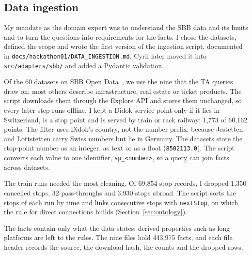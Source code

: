 %   

\subsection{Data ingestion}
\label{sec:ingestion}

My mandate as the domain expert was to understand the SBB data and its limits and to turn the questions into requirements for the facts. I chose the datasets, defined the scope and wrote the first version of the ingestion script, documented in \texttt{docs/hackathon01/DATA\_INGESTION.md}. Cyril later moved it into \texttt{src/adapters/sbb/} and added a Pydantic validation.

Of the 60 datasets on SBB Open Data~\citep{sbbdata}, we use the nine that the TA queries draw on; most others describe infrastructure, real estate or ticket products. The script downloads them through the Explore API and stores them unchanged, so every later step runs offline. I kept a Didok service point only if it lies in Switzerland, is a stop point and is served by train or rack railway: 1,773 of 60,162 points. The filter uses Didok's country, not the number prefix, because Jestetten and Lottstetten carry Swiss numbers but lie in Germany. The datasets store the stop-point number as an integer, as text or as a float (\texttt{8502113.0}). The script converts each value to one identifier, \texttt{sp\_<number>}, so a query can join facts across datasets.

The train runs needed the most cleaning. Of 69,854 stop records, I dropped 1,350 cancelled stops, 32 pass-throughs and 3,930 stops abroad. The script sorts the stops of each run by time and links consecutive stops with \texttt{nextStop}, on which the rule for direct connections builds (Section~\ref{sec:ontology}).

The facts contain only what the data states; derived properties such as long platforms are left to the rules. The nine files hold 443,975 facts, and each file header records the source, the download hash, the counts and the dropped rows.

